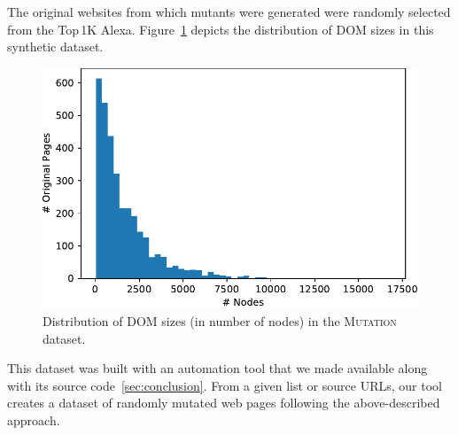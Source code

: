 \begin{table}
    \caption{Mutations applied in the \textsc{Mutation} dataset~\ref{chap:sftm}.}
    \label{table:mutations_used}
    \centering
\end{table}

The original websites from which mutants were generated were randomly selected from the Top\,1K Alexa.
Figure~\ref{fig:distribution} depicts the distribution of DOM sizes in this synthetic dataset. 

\begin{figure}[h]
  \centering
  \includegraphics[width=.8\linewidth]{erratum/distribution}
  \caption{Distribution of DOM sizes (in number of nodes) in the \textsc{Mutation} dataset.}
  \label{fig:distribution}
\end{figure}

This dataset was built with an automation tool that we made available along with its source code~\ref{sec:conclusion}.
From a given list or source URLs, our tool creates a dataset of randomly mutated web pages following the above-described approach.

